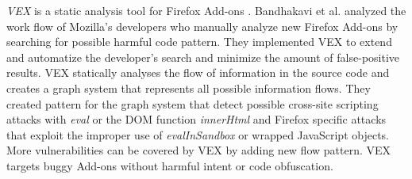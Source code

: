	\textit{VEX} is a static analysis tool for Firefox Add-ons \cite{Bandhakavi:2011:VBE:1995376.1995398}. Bandhakavi et al. analyzed the work flow of Mozilla's developers who manually analyze new Firefox Add-ons by searching for possible harmful code pattern. They implemented VEX to extend and automatize the developer's search and minimize the amount of false-positive results. VEX statically analyses the flow of information in the source code and creates a graph system that represents all possible information flows. They created pattern for the graph system that detect possible cross-site scripting attacks with \textit{eval} or the DOM function \textit{innerHtml} and Firefox specific attacks that exploit the improper use of \textit{evalInSandbox} or wrapped JavaScript objects. More vulnerabilities can be covered by VEX by adding new flow pattern. VEX targets buggy Add-ons without harmful intent or code obfuscation. 
	